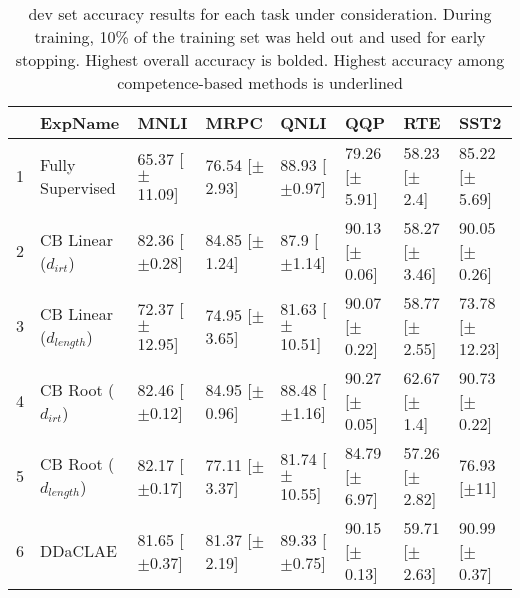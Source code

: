 \begin{table}[ht]
\centering
\begin{tabular}{rlllllll}
  \toprule
 & ExpName & MNLI & MRPC & QNLI & QQP & RTE & SST2 \\ 
  \midrule
1 & Fully Supervised & 65.37 [$\pm$11.09] & 76.54 [$\pm$2.93] & 88.93 [$\pm$0.97] & 79.26 [$\pm$5.91] & 58.23 [$\pm$2.4] & 85.22 [$\pm$5.69] \\ 
  2 & CB Linear ($d_{irt}$) & 82.36 [$\pm$0.28] & 84.85 [$\pm$1.24] & 87.9 [$\pm$1.14] & 90.13 [$\pm$0.06] & 58.27 [$\pm$3.46] & 90.05 [$\pm$0.26] \\ 
  3 & CB Linear ($d_{length}$) & 72.37 [$\pm$12.95] & 74.95 [$\pm$3.65] & 81.63 [$\pm$10.51] & 90.07 [$\pm$0.22] & 58.77 [$\pm$2.55] & 73.78 [$\pm$12.23] \\ 
  4 & CB Root ($d_{irt}$) & 82.46 [$\pm$0.12] & 84.95 [$\pm$0.96] & 88.48 [$\pm$1.16] & 90.27 [$\pm$0.05] & 62.67 [$\pm$1.4] & 90.73 [$\pm$0.22] \\ 
  5 & CB Root ($d_{length}$) & 82.17 [$\pm$0.17] & 77.11 [$\pm$3.37] & 81.74 [$\pm$10.55] & 84.79 [$\pm$6.97] & 57.26 [$\pm$2.82] & 76.93 [$\pm$11] \\ 
  6 & DDaCLAE & 81.65 [$\pm$0.37] & 81.37 [$\pm$2.19] & 89.33 [$\pm$0.75] & 90.15 [$\pm$0.13] & 59.71 [$\pm$2.63] & 90.99 [$\pm$0.37] \\ 
   \bottomrule
\end{tabular}
\caption{dev set accuracy results for each task under consideration. During training, 10\% of the training set was held out and used for early stopping. Highest overall accuracy is bolded. Highest accuracy among competence-based methods is underlined} 
\end{table}
